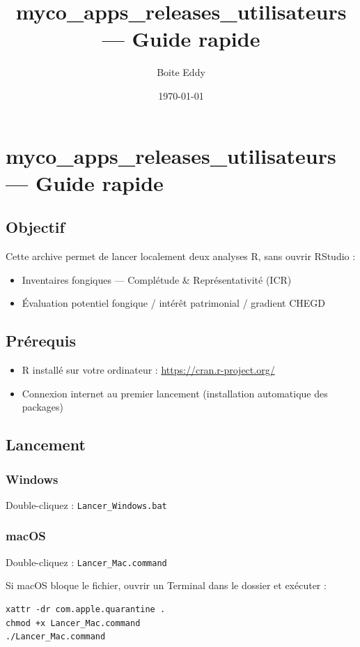 \documentclass[11pt,a4paper]{article}
\title{myco\_apps\_releases\_utilisateurs --- Guide rapide}
\author{Boite Eddy}
\date{\today}
\begin{document}
\maketitle
\section{myco\_apps\_releases\_utilisateurs --- Guide rapide}

\subsection{Objectif}

Cette archive permet de lancer localement deux analyses R, sans ouvrir RStudio :
\begin{itemize}
\item Inventaires fongiques --- Complétude \& Représentativité (ICR)
\item Évaluation potentiel fongique / intérêt patrimonial / gradient CHEGD
\end{itemize}

\subsection{Prérequis}

\begin{itemize}
\item R installé sur votre ordinateur : \url{https://cran.r-project.org/}
\item Connexion internet au premier lancement (installation automatique des packages)
\end{itemize}

\subsection{Lancement}

\subsubsection{Windows}
Double-cliquez : \texttt{Lancer\_Windows.bat}

\subsubsection{macOS}
Double-cliquez : \texttt{Lancer\_Mac.command}

Si macOS bloque le fichier, ouvrir un Terminal dans le dossier et exécuter :
\begin{verbatim}
xattr -dr com.apple.quarantine .
chmod +x Lancer_Mac.command
./Lancer_Mac.command
\end{verbatim}
\end{document}
